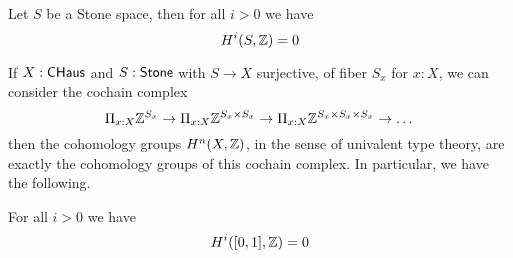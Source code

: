 \begin{theorem}
Let $S$ be a Stone space, then for all $i>0$ we have \[H^i(S,\mathbb{Z}) = 0\]
\end{theorem}

If $X:\mathsf{CHaus}$ and $S:\mathsf{Stone}$ with $S\rightarrow X$ surjective, of fiber $S_x$ for $x:X$,  we can consider the cochain complex
\[\Pi_{x:X}\mathbb{Z}^{S_x}\rightarrow \Pi_{x:X}\mathbb{Z}^{S_x\times S_x}\rightarrow \Pi_{x:X}\mathbb{Z}^{S_x\times S_x\times S_x}\rightarrow\dots\]
then the cohomology groups $H^n(X,\mathbb{Z})$, in the sense of univalent type theory, are exactly the cohomology groups of this
cochain complex. In particular, we have the following.

\begin{proposition}
For all $i>0$ we have \[H^i([0,1],\mathbb{Z}) = 0\]
\end{proposition}





